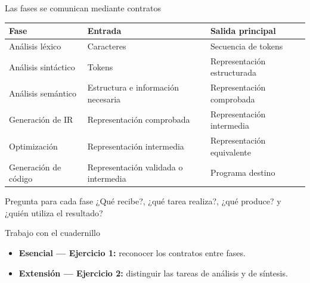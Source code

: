 \documentclass[11pt,spanish]{beamer}
\newcommand{\actividad}[1]{\textbf{\textcolor{Rojo}{#1}}}
\begin{document}
\begin{frame}{Las fases se comunican mediante contratos}
\vfill

\begin{center}
\scriptsize
\renewcommand{\arraystretch}{1.18}
\begin{tabular}{|L{.22\textwidth}|L{.28\textwidth}|L{.37\textwidth}|}
\hline
\textbf{Fase} & \textbf{Entrada} & \textbf{Salida principal} \tabularnewline
\hline
Análisis léxico & Caracteres & Secuencia de tokens \tabularnewline
\hline
Análisis sintáctico & Tokens & Representación estructurada \tabularnewline
\hline
Análisis semántico & Estructura e información necesaria & Representación comprobada \tabularnewline
\hline
Generación de IR & Representación comprobada & Representación intermedia \tabularnewline
\hline
Optimización & Representación intermedia & Representación equivalente \tabularnewline
\hline
Generación de código & Representación validada o intermedia & Programa destino \tabularnewline
\hline
\end{tabular}
\end{center}

\bigskip

\begin{block}{Pregunta para cada fase}
¿Qué recibe?, ¿qué tarea realiza?, ¿qué produce? y ¿quién utiliza el resultado?
\end{block}

\vfill
\end{frame}

\begin{frame}{Trabajo con el cuadernillo}
\vfill

\begin{center}
\end{center}

\bigskip

\begin{itemize}
\item \textbf{Esencial --- Ejercicio 1:} reconocer los contratos entre fases.
\item \textbf{Extensión --- Ejercicio 2:} distinguir las tareas de análisis y de síntesis.
\end{itemize}

\vfill
\end{frame}
\end{document}
